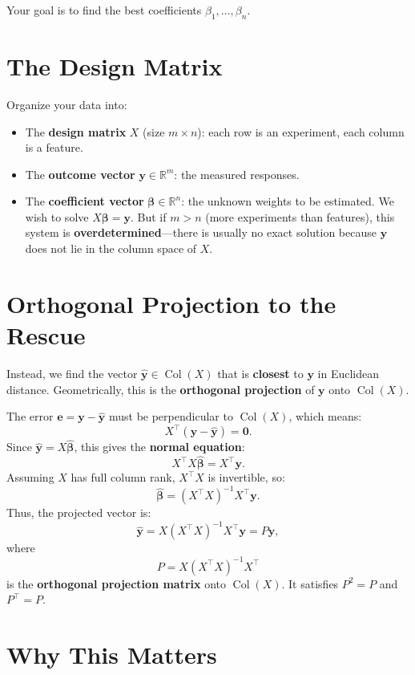 \documentclass{article}
\begin{document}
Your goal is to find the best coefficients $\beta_1, \dots, \beta_n$.

\section*{The Design Matrix}

Organize your data into:

\begin{itemize}
\item The \textbf{design matrix} $X$ (size $m \times n$): each row is an experiment, each column is a feature.
    \item The \textbf{outcome vector} $\mathbf{y} \in \mathbb{R}^m$: the measured responses.
    \item The \textbf{coefficient vector} $\boldsymbol{\beta} \in \mathbb{R}^n$: the unknown weights to be estimated.
We wish to solve $X\boldsymbol{\beta} = \mathbf{y}$. But if $m > n$ (more experiments than features), this system is \textbf{overdetermined}—there is usually no exact solution because $\mathbf{y}$ does not lie in the column space of $X$.
\end{itemize}


\section*{Orthogonal Projection to the Rescue}

Instead, we find the vector $\hat{\mathbf{y}} \in \operatorname{Col}(X)$ that is \textbf{closest} to $\mathbf{y}$ in Euclidean distance.  
Geometrically, this is the \textbf{orthogonal projection} of $\mathbf{y}$ onto $\operatorname{Col}(X)$.

The error $\mathbf{e} = \mathbf{y} - \hat{\mathbf{y}}$ must be perpendicular to $\operatorname{Col}(X)$, which means:
\[
X^\top (\mathbf{y} - \hat{\mathbf{y}}) = \mathbf{0}.
\]
Since $\hat{\mathbf{y}} = X\hat{\boldsymbol{\beta}}$, this gives the \textbf{normal equation}:
\[
X^\top X \hat{\boldsymbol{\beta}} = X^\top \mathbf{y}.
\]
Assuming $X$ has full column rank, $X^\top X$ is invertible, so:
\[
\hat{\boldsymbol{\beta}} = (X^\top X)^{-1} X^\top \mathbf{y}.
\]
Thus, the projected vector is:
\[
\hat{\mathbf{y}} = X (X^\top X)^{-1} X^\top \mathbf{y} = P \mathbf{y},
\]
where
\[
P = X (X^\top X)^{-1} X^\top
\]
is the \textbf{orthogonal projection matrix} onto $\operatorname{Col}(X)$. It satisfies $P^2 = P$ and $P^\top = P$.

\section*{Why This Matters}
\end{document}
